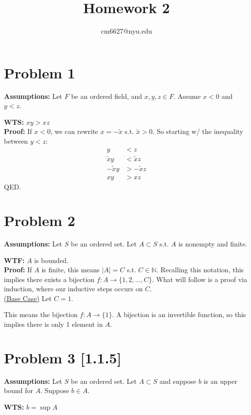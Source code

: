 \documentclass[12pt,fleqn]{article}
\title{Homework 2}
\author{cm6627@nyu.edu}
\date{}
\numberwithin{equation}{section} %
\begin{document}
\maketitle

\section*{Problem 1}
\textbf{Assumptions:} Let $F$ be an ordered field, and $x,y,z \in F$. Assume $x < 0$ and $y < z$.

\textbf{WTS:}
$xy > xz$
\\

\textbf{Proof:} If $x < 0$, we can rewrite $x = - \tilde x$ s.t. $\tilde x > 0$. So starting w/ the inequality between $y < z$:
\begin{align}
	y & < z\\
	\tilde x y & < \tilde x 	z\\
	- \tilde x y & > - \tilde x z\\
	x y & > x z
\end{align}
QED.

\section*{Problem 2}
\textbf{Assumptions:} Let $S$ be an ordered set. Let $A \subset S$ s.t. $A$ is nonempty and finite.

\textbf{WTF:} $A$ is bounded.
\\

\textbf{Proof:} If $A$ is finite, this means $|A| = C$ s.t. $C \in \mathbb N$. Recalling this notation, this implies there exists a bijection $f: A \to \{1,2,...,C\}$. What will follow is a proof via induction, where our inductive steps occurs on $C$.\\

\underline{(Base Case)} Let $C=1$.

This means the bijection $f: A \to \{1\}$. A bijection is an invertible function, so this implies there is only 1 element in $A$. 

 
 
\section*{Problem 3 [1.1.5]}
\textbf{Assumptions:} Let $S$ be an ordered set. Let $A \subset S$ and suppose $b$ is an upper bound for $A$. Suppose $b \in A$.

\textbf{WTS:} $b = \sup A$\\
\end{document}
